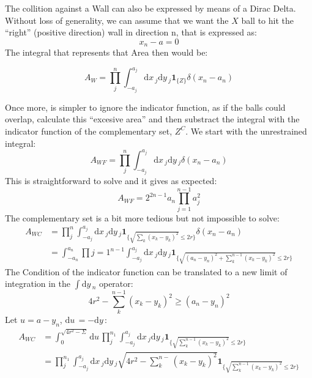 \documentclass[superscriptaddress,pre,reprint,showpacs,onecolumn]{revtex4-1}
\newcommand{\rd}[1]{\mathrm{d}{#1} \,}
\newcommand{\indicatorsymbol}{\mathbf{1}}
\newcommand{\indicator}[1]{\indicatorsymbol_{ \{   #1 \} } }
\begin{document}
The collition against a Wall can also be expressed by means of a Dirac Delta.
Without loss of generality, we can assume that we want the $X$ ball to hit
the ``right'' (positive direction) wall in direction n, that is expressed
as:
\begin{equation}
x_n-a=0   
\end{equation}
The integral that represents that Area then would be:

\begin{equation}
  A_W=\prod_j^n \int_{-a_j}^{a_j} \rd x_j \rd y_j
  \indicator{Z} \delta(x_n-a_n)
\end{equation}

Once more, is simpler to ignore the indicator function, as if the
balls could overlap, calculate this ``excesive area'' and then substract
the integral with the indicator function of the complementary set, $Z^C$.
We start with the unrestrained integral:
\begin{equation}
  A_{WF}=\prod_j^n \int_{-a_j}^{a_j} \rd x_j \rd y_j \delta(x_n -a_n)
\end{equation}
This is straightforward to solve and it gives as expected:
\begin{equation}
  A_{WF}=2^{2n-1} a_n \prod_{j=1}^{n-1} a_j^2
\end{equation}
The complementary set is a bit more tedious but not impossible to solve:
\begin{equation}
  \begin{split}
  A_{WC} & =\prod_j^n \int_{-a_j}^{a_j} \rd x_j \rd y_j
  \indicator{\sqrt{\sum_k (x_k-y_k)^2 }\leq 2 r} \delta(x_n-a_n)  \\
  & = \int_{-a_n}^{a_n} \prod{j=1}^{n-1} \int_{-a_j}^{a_j} \rd x_j \rd y_j
  \indicator{\sqrt{(a_n - y_n)^2 +\sum_k^{n-1} (x_k-y_k)^2 }\leq 2 r}
  \end{split}
\end{equation}
  The Condition of the indicator function can be translated to a
  new limit of integration in the $\int \rd y_n$ operator:
  \begin{equation}
    4 r^2 -\sum_{k}^{n-1} (x_k - y_k) ^2 \geq ( a_n - y_n )^2
  \end{equation}
  Let $u = a - y_n $, $\rd u = -\rd y$:
  \begin{equation}
    \begin{split}
      A_{WC}& =\int_0^{\sqrt{4r^2-\Sigma}} \rd u  \prod_j^{n_1} \int_{-a_j}^{a_j} \rd x_j \rd y_j
        \indicator{\sqrt{\sum_k^{n-1} (x_k -y_k)^2} \leq 2 r}\\ 
      & = \prod_j^{n_1} \int_{-a_j}^{a_j} \rd x_j \rd y_j \sqrt{4 r^2 - \sum_k^{n-} (x_k-y_k)^2}  
        \indicator{\sqrt{\sum_k^{n-1} (x_k -y_k)^2} \leq 2 r} 
    \end{split}
    \end{equation}
\end{document}
